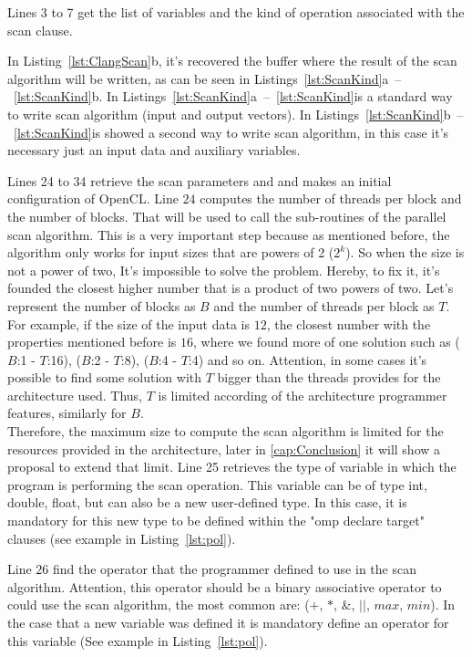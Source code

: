 \documentclass[Ingles]{ic-tese-v1}
\newcommand{\rlst}[1]{Listing~\ref{lst:#1}}
\newcommand{\rlstn}[3]{Listings~\ref{lst:#1}{#2}~--~\ref{lst:#1}{#3}}
\begin{document}
Lines 3 to 7 get the list of variables and the kind of operation
  associated with the scan clause.

In \rlst{ClangScan}{b}, it's recovered the buffer where the result of the scan
algorithm will be written, as can be seen in \rlstn{ScanKind}{a}{b}.
In \rlstn{ScanKind}{a} is a standard way to write scan algorithm (input and output vectors). In \rlstn{ScanKind}{b} is showed a second way to write scan algorithm,
in this case it's necessary just an input data and auxiliary variables.

Lines 24 to 34 retrieve the
scan parameters and and makes an initial configuration of OpenCL. Line $24$ computes the number of threads per block and the
number of blocks. That will be used to call the sub-routines of the parallel scan algorithm. This is a very important step because as mentioned before, the algorithm only works for input sizes that are powers of 2 ($2^{k}$). So when the
size is not a power of two, It's impossible to solve the problem. Hereby, to fix
it, it's founded the closest higher number that is a product of two powers of
two. Let's represent the number of blocks as $B$ and the number of threads per
block as $T$.\\ For example, if the size of the input data is $12$, the closest number with the properties mentioned before is $16$, where we found more of one solution
such as ($B$:1 - $T$:16), ($B$:2 - $T$:8), ($B$:4 - $T$:4) and so on.
Attention, in some cases it's possible to find some solution with $T$ bigger
than the threads provides for the architecture used. Thus, $T$ is limited
according of the architecture programmer features, similarly for $B$.\\
Therefore, the maximum size to compute the scan algorithm is limited for the
resources provided in the architecture, later in \ref{cap:Conclusion} it will
show a proposal to extend that limit.
Line 25 retrieves the type of variable in which the
program is performing the scan operation. This variable can be of type int,
double, float, but can also be a new user-defined type. In this case, it is
mandatory for this new type to be defined within the "omp declare target"
clauses (see example in \rlst{pol}).

Line $26$ find the operator that the programmer defined to use in the scan
algorithm. Attention, this operator should be a binary associative operator to
could use the scan algorithm, the most common are: ($+$, $*$, $\&$, $||$,
$max$, $min$). In the case that a new variable was defined it is mandatory
define an operator for this variable (See example in \rlst{pol}).
\end{document}
